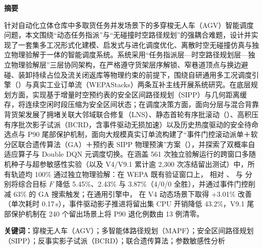 \begin{center}
  {\fontsize{11.5pt}{14pt}\selectfont\bfseries 摘\quad 要}\par
  \vspace{4pt}
  \begin{minipage}{0.86\textwidth}
    \fontsize{9.5pt}{13.5pt}\selectfont
    \setlength{\parindent}{2em}
    针对自动化立体仓库中多取货任务并发场景下的多穿梭无人车（AGV）智能调度问题，本文围绕“动态任务指派”与“无碰撞时空路径规划”的强耦合难题，设计并实现了一套集多工况形式化建模、启发式与进化调度优化、离散时空无碰撞仿真与独立物理验解于一体的智能调度系统。系统采用“任务指派层—时空路径规划层—独立物理验解层”三层协同架构，在严格遵守货架层序解锁、窄巷道顶点与换边避碰、装卸持续占位及流关闭返库等物理约束的前提下，围绕自研通用多工况调度引擎（）与真实工业订单流（WEPAStacks）两条互补主线开展系统研究。在底层规划方面，实现基于增量时空预约表的安全区间路径规划（SIPP）与几何距离缓存，将连续空闲时段压缩为安全区间状态；在调度决策方面，面向分层与混合背靠背货架发展了拥堵关联大邻域联合修复（LNS）、静态首轮有序批滚动（）、高积压有序批次影子试派（BCRD，含事件驱动无损加速）以及历史热度驱动的安全待命选点与 P90 尾部保护机制，面向大规模真实订单流构建了“事件门控滚动派单＋软分区联合遗传算法（GA）＋预约表 SIPP 物理预演”方案（），并探索了双概率自适应算子与 Double DQN 元调度切换。在涵盖 561 次独立验解运行的跨窗口多随机种子与超参敏感性实验（以及 V4/V9.1 累计逾 2,300 次冻结留出测试）中，所有轨迹均 100\% 通过独立物理验解：在 WEPA 既有验证窗口上， 相对 、 与  分别将综合目标 $F$ 降低 5.45\%、2.43\% 与 3.87\%（4/0/0 全胜），并通过事件门控削减 63\% 的 GA 搜索触发；在通用引擎中， 在 V4 动态场景下取得 +3.01\% 改善（单次耗时 0.17\,s），事件驱动影子推进将留出集 CPU 开销降低 43.2\%，V9.1 尾部保护机制在 240 个留出场景上将 P90 退化例数由 13 例清零。

    \vspace{4pt}
    \noindent\textbf{关键词：}穿梭无人车（AGV）；多智能体路径规划（MAPF）；安全区间路径规划（SIPP）；反事实影子试派（BCRD）；联合遗传算法；参数敏感性分析
  \end{minipage}
\end{center}
\vspace{8pt}

